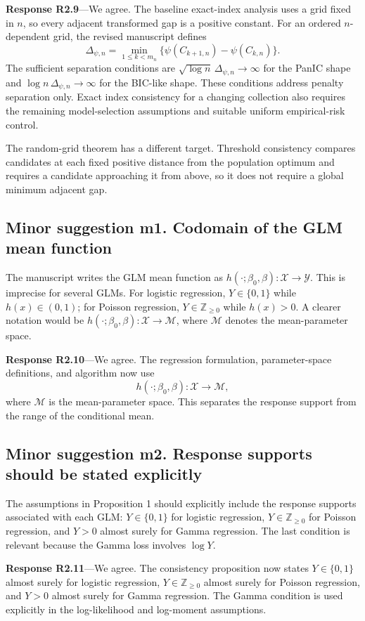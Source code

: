 \documentclass[11pt]{article}
\newcommand{\response}[1]{\par\noindent\textbf{Response #1}---}
\begin{document}
\response{R2.9}We agree. The baseline exact-index analysis uses a grid fixed in $n$, so every adjacent transformed gap is a positive constant. For an ordered $n$-dependent grid, the revised manuscript defines
\[
\Delta_{\psi,n}=\min_{1\le k<m_n}\{\psi(C_{k+1,n})-\psi(C_{k,n})\}.
\]
The sufficient separation conditions are $\sqrt{\log n}\,\Delta_{\psi,n}\to\infty$ for the PanIC shape and $\log n\,\Delta_{\psi,n}\to\infty$ for the BIC-like shape. These conditions address penalty separation only. Exact index consistency for a changing collection also requires the remaining model-selection assumptions and suitable uniform empirical-risk control.

The random-grid theorem has a different target. Threshold consistency compares candidates at each fixed positive distance from the population optimum and requires a candidate approaching it from above, so it does not require a global minimum adjacent gap.

\subsection*{Minor suggestion m1. Codomain of the GLM mean function}
The manuscript writes the GLM mean function as $h(\cdot;\beta_0,\beta):\mathcal X\to\mathcal Y$. This is imprecise for several GLMs. For logistic regression, $Y\in\{0,1\}$ while $h(x)\in(0,1)$; for Poisson regression, $Y\in\mathbb Z_{\geq0}$ while $h(x)>0$. A clearer notation would be $h(\cdot;\beta_0,\beta):\mathcal X\to\mathcal M$, where $\mathcal M$ denotes the mean-parameter space.

\response{R2.10}We agree. The regression formulation, parameter-space definitions, and algorithm now use
\[
h(\cdot;\beta_0,\beta):\mathcal X\to\mathcal M,
\]
where $\mathcal M$ is the mean-parameter space. This separates the response support from the range of the conditional mean.

\subsection*{Minor suggestion m2. Response supports should be stated explicitly}
The assumptions in Proposition 1 should explicitly include the response supports associated with each GLM: $Y\in\{0,1\}$ for logistic regression, $Y\in\mathbb Z_{\geq0}$ for Poisson regression, and $Y>0$ almost surely for Gamma regression. The last condition is relevant because the Gamma loss involves $\log Y$.

\response{R2.11}We agree. The consistency proposition now states $Y\in\{0,1\}$ almost surely for logistic regression, $Y\in\mathbb Z_{\ge0}$ almost surely for Poisson regression, and $Y>0$ almost surely for Gamma regression. The Gamma condition is used explicitly in the log-likelihood and log-moment assumptions.
\end{document}
